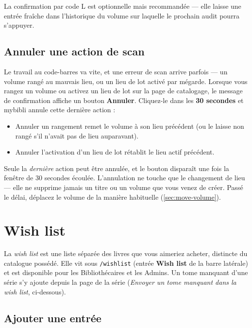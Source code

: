 La confirmation par code L est optionnelle mais recommandée — elle
laisse une entrée fraîche dans l'historique du volume sur laquelle
le prochain audit pourra s'appuyer.

\subsection{Annuler une action de scan}\label{sec:scan-undo}

Le travail au code-barres va vite, et une erreur de scan arrive
parfois — un volume rangé au mauvais lieu, ou un lieu de lot activé
par mégarde. Lorsque vous rangez un volume ou activez un lieu de lot
sur la page de catalogage, le message de confirmation affiche un
bouton \textbf{Annuler}. Cliquez-le dans les \textbf{30 secondes} et
mybibli annule cette dernière action :

\begin{itemize}
  \item Annuler un rangement remet le volume à son lieu précédent
        (ou le laisse non rangé s'il n'avait pas de lieu auparavant).
  \item Annuler l'activation d'un lieu de lot rétablit le lieu actif
        précédent.
\end{itemize}

Seule la \emph{dernière} action peut être annulée, et le bouton
disparaît une fois la fenêtre de 30 secondes écoulée. L'annulation ne
touche que le changement de lieu — elle ne supprime jamais un titre
ou un volume que vous venez de créer. Passé le délai, déplacez le
volume de la manière habituelle (\autoref{sec:move-volume}).

\section{Wish list}\label{sec:wishlist}

La \emph{wish list} est une liste séparée des
livres que vous aimeriez acheter, distincte du catalogue possédé.
Elle vit sous \texttt{/wishlist} (entrée
\textbf{Wish list} de la barre latérale) et est disponible pour les Bibliothécaires
et les Admins. Un tome manquant d'une série s'y ajoute depuis la page
de la série (\emph{Envoyer un tome manquant dans la wish list},
ci-dessous).

\subsection{Ajouter une entrée}

